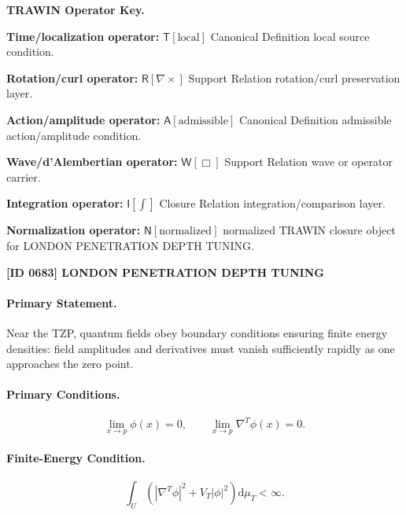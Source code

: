 \par\vspace{0.45\baselineskip}
\noindent\begin{minipage}[t]{\linewidth}
\begingroup
\small
\raggedright
\textbf{TRAWIN Operator Key.}\par
\noindent\textbf{Time/localization operator:} $\mathsf{T}\!\left[\mathrm{local}\right]$ Canonical Definition local source condition.\par
\noindent\textbf{Rotation/curl operator:} $\mathsf{R}\!\left[\nabla\times\right]$ Support Relation rotation/curl preservation layer.\par
\noindent\textbf{Action/amplitude operator:} $\mathsf{A}\!\left[\mathrm{admissible}\right]$ Canonical Definition admissible action/amplitude condition.\par
\noindent\textbf{Wave/d'Alembertian operator:} $\mathsf{W}\!\left[\Box\right]$ Support Relation wave or operator carrier.\par
\noindent\textbf{Integration operator:} $\mathsf{I}\!\left[\int\right]$ Closure Relation integration/comparison layer.\par
\noindent\textbf{Normalization operator:} $\mathsf{N}\!\left[\mathrm{normalized}\right]$ normalized TRAWIN closure object for LONDON PENETRATION DEPTH TUNING.\par
\endgroup
\end{minipage}

\clearpage
\noindent\textbf{[ID 0683] LONDON PENETRATION DEPTH TUNING}\par
\vspace{0.35em}
\paragraph{Primary Statement.}
Near the TZP, quantum fields obey boundary conditions ensuring finite energy densities: field amplitudes and derivatives must vanish sufficiently rapidly as one approaches the zero point.

\paragraph{Primary Conditions.}
\begin{equation}
\lim_{x\to p}\phi(x)=0,
\qquad
\lim_{x\to p}\nabla^T\phi(x)=0 .
\end{equation}

\paragraph{Finite-Energy Condition.}
\begin{equation}
\int_U
\left(
|\nabla^T\phi|^2
+
V_T|\phi|^2
\right)
\mathrm{d}\mu_T
<\infty .
\end{equation}

